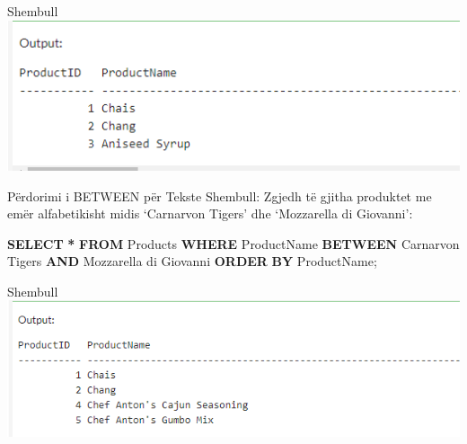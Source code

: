 \documentclass[
  ignorenonframetext,
]{beamer}
\newenvironment{Shaded}{\begin{snugshade}}{\end{snugshade}}
\newcommand{\KeywordTok}[1]{\textcolor[rgb]{0.13,0.29,0.53}{\textbf{#1}}}
\newcommand{\NormalTok}[1]{#1}
\newcommand{\OperatorTok}[1]{\textcolor[rgb]{0.81,0.36,0.00}{\textbf{#1}}}
\newcommand{\StringTok}[1]{\textcolor[rgb]{0.31,0.60,0.02}{#1}}
\begin{document}
\begin{frame}{Shembull}
\label{shembull-25}
\includegraphics{./Figs/query80.png}
\end{frame}

\begin{frame}[fragile]{Përdorimi i BETWEEN për Tekste}
\label{puxebrdorimi-i-between-puxebr-tekste}
Shembull: Zgjedh të gjitha produktet me emër alfabetikisht midis
`Carnarvon Tigers' dhe `Mozzarella di Giovanni':


\begin{Shaded}
\begin{Highlighting}[]
\KeywordTok{SELECT} \OperatorTok{*}
\KeywordTok{FROM}\NormalTok{ Products}
\KeywordTok{WHERE}\NormalTok{ ProductName }\KeywordTok{BETWEEN} \StringTok{\textquotesingle{}Carnarvon Tigers\textquotesingle{}} \KeywordTok{AND} \StringTok{\textquotesingle{}Mozzarella di Giovanni\textquotesingle{}}
\KeywordTok{ORDER} \KeywordTok{BY}\NormalTok{ ProductName;}
\end{Highlighting}
\end{Shaded}
\end{frame}

\begin{frame}{Shembull}
\label{shembull-26}
\includegraphics{./Figs/query81.png}
\end{frame}
\end{document}
